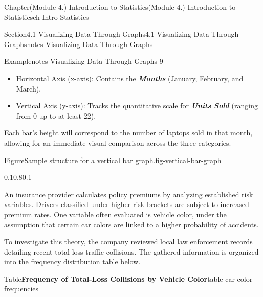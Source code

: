 \documentclass[oneside,10pt,]{book}
\newcommand{\ptxlistdisc}{\raisebox{0.3ex}{\textbullet}}
\newcommand{\alert}[1]{\textbf{\textit{#1}}}
\begin{document}
\begin{chapterptx}{Chapter}{(Module 4.) Introduction to Statistics}{}{(Module 4.) Introduction to Statistics}{}{}{ch-Intro-Statistics}
\begin{sectionptx}{Section}{4.1 Visualizing Data Through Graphs}{}{4.1 Visualizing Data Through Graphs}{}{}{notes-Visualizing-Data-Through-Graphs}
\begin{example}{Example}{}{notes-Visualizing-Data-Through-Graphs-9}
\begin{itemize}[label=\ptxlistdisc]
\item{}Horizontal Axis (x-axis): Contains the \alert{Months} (January, February, and March).%
\item{}Vertical Axis (y-axis): Tracks the quantitative scale for \alert{Units Sold} (ranging from 0 up to at least 22).%
\end{itemize}
%
\par
Each bar's height will correspond to the number of laptops sold in that month, allowing for an immediate visual comparison across the three categories.%
\begin{figureptx}{Figure}{Sample structure for a vertical bar graph.}{fig-vertical-bar-graph}{}%
\begin{image}{0.1}{0.8}{0.1}{}%
%
\end{image}%
\tcblower
\end{figureptx}%
\end{example}
An insurance provider calculates policy premiums by analyzing established risk variables. Drivers classified under higher-risk brackets are subject to increased premium rates. One variable often evaluated is vehicle color, under the assumption that certain car colors are linked to a higher probability of accidents.%
\par
To investigate this theory, the company reviewed local law enforcement records detailing recent total-loss traffic collisions. The gathered information is organized into the frequency distribution table below.%
\begin{tableptx}{Table}{\textbf{Frequency of Total-Loss Collisions by Vehicle Color}}{table-car-color-frequencies}{}%

\end{tableptx}
\end{sectionptx}
\end{chapterptx}
\end{document}
